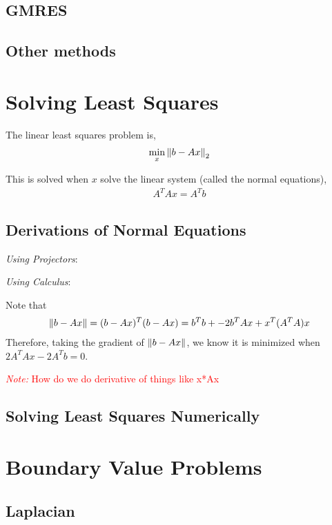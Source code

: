 \documentclass[12pt]{article}
\newcommand{\note}[1]{\textcolor{red}{\textit{Note:} #1}}
\begin{document}
\subsection{GMRES}

\subsection{Other methods}

\section{Solving Least Squares}
The linear least squares problem is,
\begin{align*}
    \min_{x} \left\lVert b-Ax\right\rVert_2
\end{align*}

This is solved when \( x \) solve the linear system (called the normal equations),
\begin{align*}
    A^TAx = A^Tb
\end{align*}


\subsection{Derivations of Normal Equations}

\textit{Using Projectors}:


\textit{Using Calculus}:

Note that
\begin{align*}
    \left\lVert b-Ax\right\rVert = (b-Ax)^T(b-Ax) = b^Tb + -2b^TAx + x^T(A^TA)x
\end{align*}
Therefore, taking the gradient of \( \left\lVert b-Ax\right\rVert \), we know it is minimized when \( 2A^TAx - 2A^Tb = 0 \). 

\note{How do we do derivative of things like x*Ax }

\subsection{Solving Least Squares Numerically}

\pagebreak
\section{Boundary Value Problems}

\subsection{Laplacian}
\end{document}
